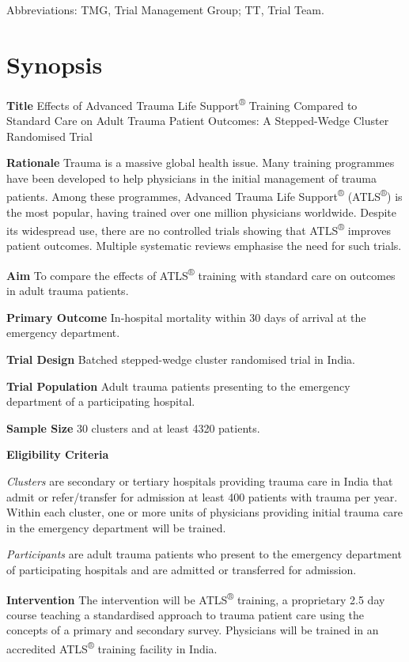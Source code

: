 \documentclass[
]{scrartcl}
\begin{document}
Abbreviations: TMG, Trial Management Group; TT, Trial Team.

\newpage{}

\section{Synopsis}\label{synopsis}

\textbf{Title} Effects of Advanced Trauma Life
Support\textsuperscript{®} Training Compared to Standard Care on Adult
Trauma Patient Outcomes: A Stepped-Wedge Cluster Randomised Trial

\textbf{Rationale} Trauma is a massive global health issue. Many
training programmes have been developed to help physicians in the
initial management of trauma patients. Among these programmes, Advanced
Trauma Life Support\textsuperscript{®} (ATLS\textsuperscript{®}) is the
most popular, having trained over one million physicians worldwide.
Despite its widespread use, there are no controlled trials showing that
ATLS\textsuperscript{®} improves patient outcomes. Multiple systematic
reviews emphasise the need for such trials.

\textbf{Aim} To compare the effects of ATLS\textsuperscript{®} training
with standard care on outcomes in adult trauma patients.

\textbf{Primary Outcome} In-hospital mortality within 30 days of arrival
at the emergency department.

\textbf{Trial Design} Batched stepped-wedge cluster randomised trial in
India.

\textbf{Trial Population} Adult trauma patients presenting to the
emergency department of a participating hospital.

\textbf{Sample Size} 30 clusters and at least 4320 patients.

\textbf{Eligibility Criteria}

\emph{Clusters} are secondary or tertiary hospitals providing trauma
care in India that admit or refer/transfer for admission at least 400
patients with trauma per year. Within each cluster, one or more units of
physicians providing initial trauma care in the emergency department
will be trained.

\emph{Participants} are adult trauma patients who present to the
emergency department of participating hospitals and are admitted or
transferred for admission.

\textbf{Intervention} The intervention will be ATLS\textsuperscript{®}
training, a proprietary 2.5 day course teaching a standardised approach
to trauma patient care using the concepts of a primary and secondary
survey. Physicians will be trained in an accredited
ATLS\textsuperscript{®} training facility in India.
\end{document}
